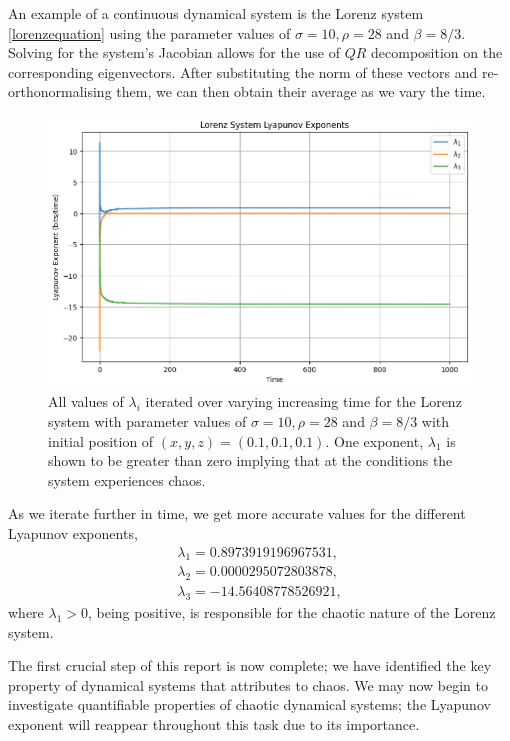 \begin{exmp} An example of a continuous dynamical system is the Lorenz system \ref{lorenzequation} using the parameter values of $ \sigma = 10, \rho = 28 $ and $ \beta = 8/3$. Solving for the system's Jacobian allows for the use of $QR$ decomposition on the corresponding eigenvectors. After substituting the norm of these vectors and re-orthonormalising them, we can then obtain their average as we vary the time. \cite{OED}
\begin{figure}
    \centering
    \includegraphics[width=1\linewidth]{Images/lorenz_lypunov.png}
    \caption{All values of $\lambda_i$ iterated over varying increasing time for the Lorenz system with parameter values of $\sigma = 10, \rho = 28$ and $\beta = 8/3$ with initial position of $(x,y,z)=(0.1,0.1,0.1)$. One exponent, $\lambda_1$ is shown to be greater than zero implying that at the conditions the system experiences chaos.}
    \label{fig:enter-label}
\end{figure}
As we iterate further in time, we get more accurate values for the different Lyapunov exponents, %
\begin{align*}
    \lambda_1 = 0.8973919196967531, \\
    \lambda_2 = 0.0000295072803878 ,\\
    \lambda_3 = -14.56408778526921,
\end{align*}
where $\lambda_1>0$, being positive, is responsible for the chaotic nature of the Lorenz system.
\end{exmp}
The first crucial step of this report is now complete; we have identified the key property of dynamical systems that attributes to chaos. We may now begin to investigate quantifiable properties of chaotic dynamical systems; the Lyapunov exponent will reappear throughout this task due to its importance.
